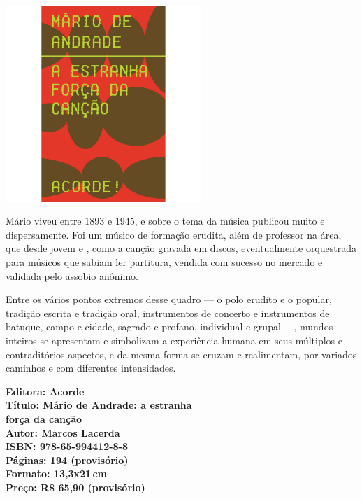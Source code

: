 \begin{center}
\hspace*{-3.6cm}
\hspace*{3.1cm}\includegraphics[width=74mm]{./CAPAS/ACORDE_MARIO.jpg}
\end{center}
\hspace*{-7cm}\hrulefill\hspace*{-7cm}
\medskip

\noindent{}Mário viveu entre 1893 e 1945, e sobre o tema da música publicou muito e dispersamente. Foi um músico de formação erudita, além de professor na área, que desde jovem e , como a canção gravada em discos, eventualmente orquestrada para músicos que sabiam ler partitura, vendida com sucesso no mercado e validada pelo assobio anônimo. 

Entre os vários pontos extremos desse quadro --- o polo erudito e o popular, tradição escrita e tradição oral, instrumentos de concerto e instrumentos de batuque, campo e cidade, sagrado e profano, individual e grupal ---, mundos inteiros se apresentam e simbolizam a experiência humana em seus múltiplos e contraditórios aspectos, e da mesma forma se cruzam e realimentam, por variados caminhos e com diferentes intensidades.

\vfill
\hspace*{-.4cm}\begin{minipage}[c]{.5\linewidth}
\small\textbf{
\hspace*{-.1cm}Editora: Acorde\\
Título: Mário de Andrade: a estranha\\força da canção\\
Autor: Marcos Lacerda\\ 
ISBN: 978-65-994412-8-8\\
Páginas: 194 (provisório)\\
Formato: 13,3x21\,cm\\
Preço: R\$ 65,90 (provisório)\\
}
\end{minipage}

